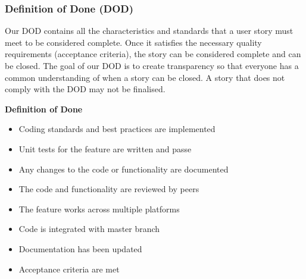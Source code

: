 \subsubsection{Definition of Done (DOD)}
Our DOD contains all the characteristics and standards that a user story must meet to be considered complete.
Once it satisfies the necessary quality requirements (acceptance criteria), the story can be considered complete and can be closed.
The goal of our DOD is to create transparency so that everyone has a common understanding of when a story can be closed.
A story that does not comply with the DOD may not be finalised.

\textbf{Definition of Done}
\begin{itemize}
    \item Coding standards and best practices are implemented
    \item Unit tests for the feature are written and passe
    \item Any changes to the code or functionality are documented
    \item The code and functionality are reviewed by peers
    \item The feature works across multiple platforms
    \item Code is integrated with master branch
    \item Documentation has been updated
    \item Acceptance criteria are met
\end{itemize}
\clearpage


